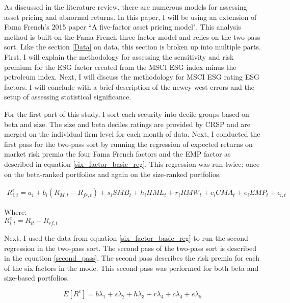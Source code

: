 As discussed in the literature review, there are numerous models for assessing asset pricing and abnormal returns. In this paper, I will be using an extension of Fama French's 2015 paper ``A five-factor asset pricing model". This analysis method is built on the Fama French three-factor model and relies on the two-pass sort. Like the section \ref{Data} on data, this section is broken up into multiple parts. First, I will explain the methodology for assessing the sensitivity and risk premium for the ESG factor created from the MSCI ESG index minus the petroleum index. Next, I will discuss the methodology for MSCI ESG rating ESG factors. I will conclude with a brief description of the newey west errors and the setup of assessing statistical significance. 


For the first part of this study, I sort each security into decile groups based on beta and size. The size and beta deciles ratings are provided by CRSP and are merged on the individual firm level for each month of data. Next, I conducted the first pass for the two-pass sort by running the regression of expected returns on market risk premia the four Fama French factors and the EMP factor as described in equation \eqref{six_factor_basic_reg}. This regression was run twice: once on the beta-ranked portfolios and again on the size-ranked portfolios.



\begin{equation}
\begin{split}
    R_{i,t}^e = a_i+b_i(R_{M,t}-R_{fr,t})+s_iSMB_t+ h_iHML_t+  r_iRMW_t+c_iCMA_t+e_iEMP_t +\epsilon_{i,t}
    \end{split}
    \label{six_factor_basic_reg}
\end{equation}

\begin{center}
Where:\\
    $R_{i,t}^e = R_{it}-R_{rf,t}$
\end{center}

Next, I used the data from equation \eqref{six_factor_basic_reg} to run the second regression in the two-pass sort. The second pass of the two-pass sort is described in the equation  \eqref{second_pass}. The second pass describes the risk premia for each of the six factors in the mode. This second pass was performed for both beta and size-based portfolios.

\begin{equation}
    E[R^e]= b\lambda_1+s\lambda_2 +h\lambda_3 +r\lambda_4 +c \lambda_4 + e\lambda_5
    \label{second_pass}
\end{equation}\\

